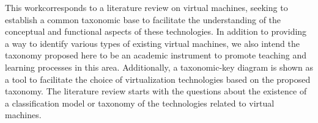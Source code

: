 		
		This work\footnotemark[1] corresponds to a literature review on virtual machines, seeking to establish a common taxonomic base to facilitate the understanding of the conceptual and functional aspects of these technologies. In addition to providing a way to identify various types of existing virtual machines, we also intend the taxonomy proposed here to be an academic instrument to promote teaching and learning processes in this area. Additionally, a taxonomic-key diagram is shown as a tool to facilitate the choice of virtualization technologies based on the proposed taxonomy. The literature review starts with the questions about the existence of a classification model or taxonomy of the technologies related to virtual machines.
		
		
